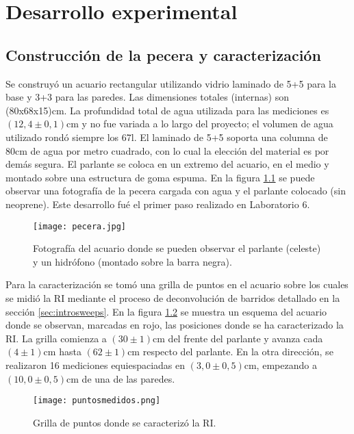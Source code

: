 \chapter{Desarrollo experimental}
\section{Construcción de la pecera y caracterización}
Se construyó un acuario rectangular utilizando vidrio laminado de 5+5 para la base y 3+3 para las paredes. Las dimensiones totales (internas) son (80x68x15)cm. La profundidad total de agua utilizada para las mediciones es $(12,4\pm0,1)$cm y no fue variada a lo largo del proyecto; el volumen de agua utilizado rondó siempre los 67l. El laminado de 5+5 soporta una columna de 80cm de agua por metro cuadrado, con lo cual la elección del material es por demás segura. El parlante se coloca en un extremo del acuario, en el medio y montado sobre una estructura de goma espuma. En la figura \ref{fig:acuario} se puede observar una fotografía de la pecera cargada con agua y el parlante colocado (sin neoprene). Este desarrollo fué el primer paso realizado en Laboratorio 6.

\begin{figure}[H]
	\centering
		\texttt{[image: pecera.jpg]}
		\caption{Fotografía del acuario donde se pueden observar el parlante (celeste) y un hidrófono (montado sobre la barra negra).}
	\label{fig:acuario}
\end{figure}

Para la caracterización se tomó una grilla de puntos en el acuario sobre los cuales se midió la RI mediante el proceso de deconvolución de barridos detallado en la sección \ref{sec:introsweeps}. En la figura \ref{fig:grilla} se muestra un esquema del acuario donde se observan, marcadas en rojo, las posiciones donde se ha caracterizado la RI. La grilla comienza a $(30\pm1)$cm del frente del parlante y avanza cada $(4\pm1)$cm hasta $(62\pm1)$cm respecto del parlante. En la otra dirección, se realizaron 16 mediciones equiespaciadas en $(3,0\pm0,5)$cm, empezando a $(10,0\pm0,5)$cm de una de las paredes.

\begin{figure}[H]
	\centering
		\texttt{[image: puntosmedidos.png]}
		\caption{Grilla de puntos donde se caracterizó la RI.}
	\label{fig:grilla}
\end{figure}

